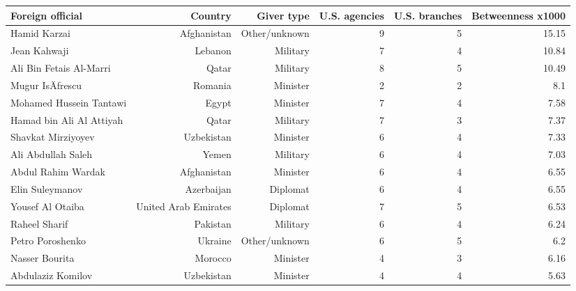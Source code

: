 \begin{tabular}{lrrrrr}
\toprule
Foreign official & Country & Giver type & U.S. agencies & U.S. branches & Betweenness x1000 \\
\midrule
Hamid Karzai & Afghanistan & Other/unknown & 9 & 5 & 15.15 \\
Jean Kahwaji & Lebanon & Military & 7 & 4 & 10.84 \\
Ali Bin Fetais Al-Marri & Qatar & Military & 8 & 5 & 10.49 \\
Mugur IsÄƒrescu & Romania & Minister & 2 & 2 & 8.1 \\
Mohamed Hussein Tantawi & Egypt & Minister & 7 & 4 & 7.58 \\
Hamad bin Ali Al Attiyah & Qatar & Military & 7 & 3 & 7.37 \\
Shavkat Mirziyoyev & Uzbekistan & Minister & 6 & 4 & 7.33 \\
Ali Abdullah Saleh & Yemen & Military & 6 & 4 & 7.03 \\
Abdul Rahim Wardak & Afghanistan & Minister & 6 & 4 & 6.55 \\
Elin Suleymanov & Azerbaijan & Diplomat & 6 & 4 & 6.55 \\
Yousef Al Otaiba & United Arab Emirates & Diplomat & 7 & 5 & 6.53 \\
Raheel Sharif & Pakistan & Military & 6 & 4 & 6.24 \\
Petro Poroshenko & Ukraine & Other/unknown & 6 & 5 & 6.2 \\
Nasser Bourita & Morocco & Minister & 4 & 3 & 6.16 \\
Abdulaziz Komilov & Uzbekistan & Minister & 4 & 4 & 5.63 \\
\bottomrule
\end{tabular}
\par{}
